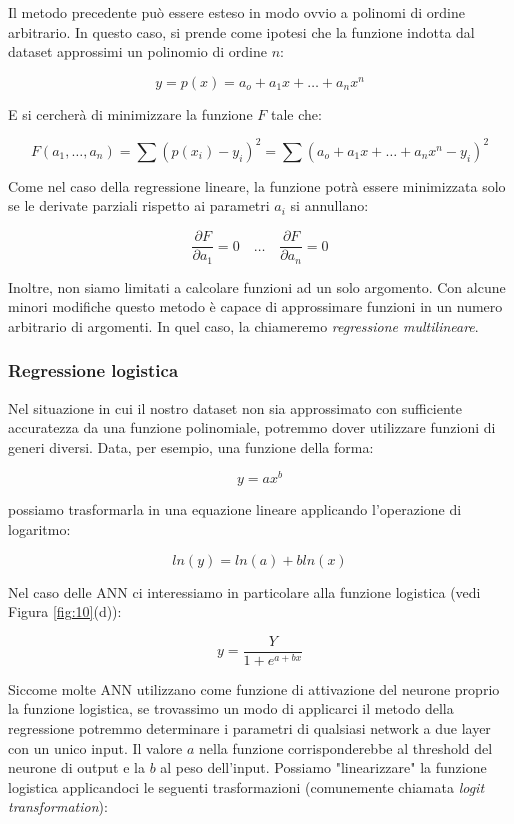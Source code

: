 \documentclass[10pt,a4paper]{article}
\begin{document}
Il metodo precedente può essere esteso in modo ovvio a polinomi di ordine arbitrario. In questo caso, si prende come ipotesi che la funzione indotta dal dataset approssimi un polinomio di ordine $n$:

$$
y = p(x) = a_o + a_1x + \dots + a_nx^n
$$

E si cercherà di minimizzare la funzione $F$ tale che:

$$
F(a_1,\dots,a_n) = \sum(p(x_i) - y_i)^2 = \sum(a_o + a_1x + \dots + a_nx^n -y_i)^2
$$

Come nel caso della regressione lineare, la funzione potrà essere minimizzata solo se le derivate parziali rispetto ai parametri $a_i$ si annullano:

$$
\frac{\partial F}{\partial a_1} = 0 \quad \dots \quad \frac{\partial F}{\partial a_n} = 0
$$

Inoltre, non siamo limitati a calcolare funzioni ad un solo argomento. Con alcune minori modifiche questo metodo è capace di approssimare funzioni in un numero arbitrario di argomenti. In quel caso, la chiameremo \emph{regressione multilineare}.

\subsubsection{Regressione logistica}

Nel situazione in cui il nostro dataset non sia approssimato con sufficiente accuratezza da una funzione polinomiale, potremmo dover utilizzare funzioni di generi diversi. Data, per esempio, una funzione della forma:

$$
y = ax^b
$$

possiamo trasformarla in una equazione lineare applicando l'operazione di logaritmo:

$$
ln(y) = ln(a) + bln(x)
$$

Nel caso delle ANN ci interessiamo in particolare alla funzione logistica (vedi Figura \ref{fig:10}(d)):

$$
y = \frac{Y}{1 + e^{a+bx}}
$$

Siccome molte ANN utilizzano come funzione di attivazione del neurone proprio la funzione logistica, se trovassimo un modo di applicarci il metodo della regressione potremmo determinare i parametri di qualsiasi network a due layer con un unico input. Il valore $a$ nella funzione corrisponderebbe al threshold del neurone di output e la $b$ al peso dell'input. Possiamo "linearizzare" la funzione logistica applicandoci le seguenti trasformazioni (comunemente chiamata \emph{logit transformation}):
\end{document}
